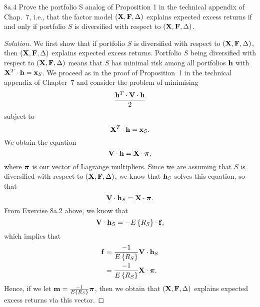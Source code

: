 \begin{problem}{8a.4}
Prove the portfolio S analog of Proposition 1 in the technical appendix of Chap.\ 7, i.e., that the factor model $(\mathbf{X}, \mathbf{F}, \Delta)$ explains expected excess returns if and only if portfolio $S$ is diversified with respect to $(\mathbf{X}, \mathbf{F}, \Delta)$.
\end{problem}
\begin{proof}[Solution]
We first show that if portfolio $S$ is diversified with respect to $(\mathbf{X}, \mathbf{F}, \Delta)$, then $(\mathbf{X}, \mathbf{F}, \Delta)$ explains expected excess returns. Portfolio $S$ being diversified with respect to $(\mathbf{X}, \mathbf{F}, \Delta)$ means that $S$ has minimal risk among all portfolios $\mathbf{h}$ with $\mathbf{X}^{T} \cdot \mathbf{h} = \mathbf{x}_{S}$. We proceed as in the proof of Proposition~1 in the technical appendix of Chapter~7 and consider the problem of minimising \[\frac{\mathbf{h}^{T}\cdot \mathbf{V} \cdot \mathbf{h}}{2}\] subject to \[\mathbf{X}^{T} \cdot \mathbf{h} = \mathbf{x}_{S}.\] We obtain the equation \[\mathbf{V} \cdot \mathbf{h} = \mathbf{X} \cdot \bm{\pi},\] where $\bm{\pi}$ is our vector of Lagrange multipliers. Since we are assuming that $S$ is diversified with respect to $(\mathbf{X}, \mathbf{F}, \Delta)$, we know that $\mathbf{h}_{S}$ solves this equation, so that \[\mathbf{V} \cdot \mathbf{h}_{S} = \mathbf{X} \cdot \bm{\pi}.\] From Exercise 8a.2 above, we know that \[\mathbf{V} \cdot \mathbf{h}_{S} = -E\left\{R_{S}\right\}\cdot \mathbf{f},\] which implies that
\begin{align*}
\mathbf{f} &= \frac{-1}{E\left\{R_{S}\right\}} \mathbf{V} \cdot \mathbf{h}_{S}\\
&= \frac{-1}{E\left\{R_{S}\right\}}\mathbf{X} \cdot \bm{\pi}.
\end{align*}
Hence, if we let $\mathbf{m} = \frac{-1}{E\left\{R_{S}\right\}}\bm{\pi}$, then we obtain that $(\mathbf{X}, \mathbf{F}, \Delta)$ explains expected excess returns via this vector.


\end{proof}
